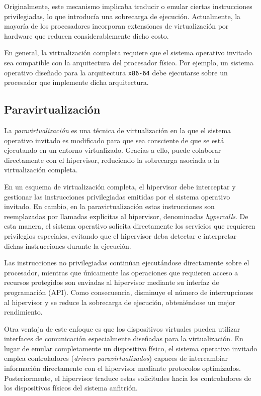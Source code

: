 Originalmente, este mecanismo implicaba traducir o emular ciertas instrucciones privilegiadas, lo que introducía una sobrecarga de ejecución. Actualmente, la mayoría de los procesadores incorporan extensiones de virtualización por hardware que reducen considerablemente dicho costo.

En general, la virtualización completa requiere que el sistema operativo invitado sea compatible con la arquitectura del procesador físico. Por ejemplo, un sistema operativo diseñado para la arquitectura \texttt{x86-64} debe ejecutarse sobre un procesador que implemente dicha arquitectura.

\subsection{Paravirtualización}

La \textit{paravirtualización} es una técnica de virtualización en la que el sistema operativo invitado es modificado para que sea consciente de que se está ejecutando en un entorno virtualizado. Gracias a ello, puede colaborar directamente con el hipervisor, reduciendo la sobrecarga asociada a la virtualización completa.

En un esquema de virtualización completa, el hipervisor debe interceptar y gestionar las instrucciones privilegiadas emitidas por el sistema operativo invitado. En cambio, en la paravirtualización estas instrucciones son reemplazadas por llamadas explícitas al hipervisor, denominadas \textit{hypercalls}. De esta manera, el sistema operativo solicita directamente los servicios que requieren privilegios especiales, evitando que el hipervisor deba detectar e interpretar dichas instrucciones durante la ejecución.

Las instrucciones no privilegiadas continúan ejecutándose directamente sobre el procesador, mientras que únicamente las operaciones que requieren acceso a recursos protegidos son enviadas al hipervisor mediante su interfaz de programación (API). Como consecuencia, disminuye el número de interrupciones al hipervisor y se reduce la sobrecarga de ejecución, obteniéndose un mejor rendimiento.

Otra ventaja de este enfoque es que los dispositivos virtuales pueden utilizar interfaces de comunicación especialmente diseñadas para la virtualización. En lugar de emular completamente un dispositivo físico, el sistema operativo invitado emplea controladores (\textit{drivers paravirtualizados}) capaces de intercambiar información directamente con el hipervisor mediante protocolos optimizados. Posteriormente, el hipervisor traduce estas solicitudes hacia los controladores de los dispositivos físicos del sistema anfitrión.


